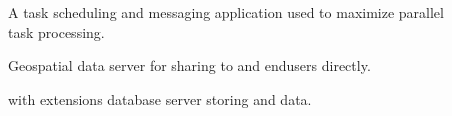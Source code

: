 \documentclass[letterpaper,10pt,english]{sphinxmanual}
\begin{document}
\begin{description}
\item[{{\hyperref[\detokenize{glossary:term-Celery}]{}}}] \leavevmode
\sphinxAtStartPar
A task scheduling and messaging application used to maximize parallel task processing.

\item[{{\hyperref[\detokenize{glossary:term-GeoServer}]{}}}] \leavevmode
\sphinxAtStartPar
Geospatial data server for sharing to {\hyperref[\detokenize{glossary:term-GeoNode}]{}} and end\sphinxhyphen{}users directly.

\item[{{\hyperref[\detokenize{glossary:term-GeoNode-db}]{}}}] \leavevmode
\sphinxAtStartPar
{\hyperref[\detokenize{glossary:term-PostgreSQL}]{}} with {\hyperref[\detokenize{glossary:term-PostGIS}]{}} extensions database server storing {\hyperref[\detokenize{glossary:term-GeoNode}]{}} {\hyperref[\detokenize{glossary:term-Django}]{}} and {\hyperref[\detokenize{glossary:term-GeoServer}]{}} data.

\end{description}
\end{document}
